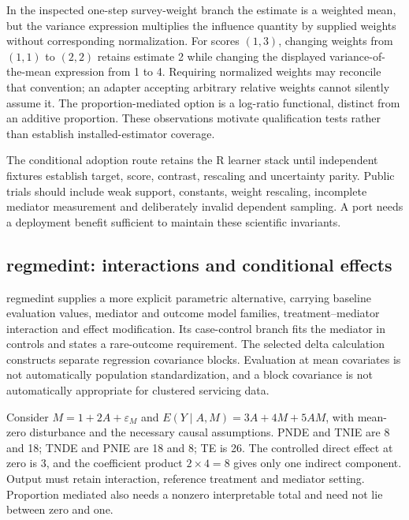 In the inspected one-step survey-weight branch the estimate is a weighted
mean, but the variance expression multiplies the influence quantity by supplied
weights without corresponding normalization. For scores $(1,3)$, changing
weights from $(1,1)$ to $(2,2)$ retains estimate 2 while changing the displayed
variance-of-the-mean expression from 1 to 4. Requiring normalized weights may
reconcile that convention; an adapter accepting arbitrary relative weights
cannot silently assume it. The proportion-mediated option is a log-ratio
functional, distinct from an additive proportion. These observations motivate
qualification tests rather than establish installed-estimator coverage.
\citep{exec25_rmed_medoutcon,exec25_rmed_choice}

The conditional adoption route retains the R learner stack until independent
fixtures establish target, score, contrast, rescaling and uncertainty parity.
Public trials should include weak support, constants, weight rescaling,
incomplete mediator measurement and deliberately invalid dependent sampling.
A port needs a deployment benefit sufficient to maintain these scientific
invariants. \citep{exec25_rmed_choice}

\subsection{regmedint: interactions and conditional effects}

regmedint supplies a more explicit parametric alternative, carrying baseline
evaluation values, mediator and outcome model families, treatment--mediator
interaction and effect modification. Its case-control branch fits the mediator
in controls and states a rare-outcome requirement. The selected delta
calculation constructs separate regression covariance blocks. Evaluation at
mean covariates is not automatically population standardization, and a block
covariance is not automatically appropriate for clustered servicing data.
\citep{exec25_rmed_regmedint}

Consider $M=1+2A+\varepsilon_M$ and
$E(Y\mid A,M)=3A+4M+5AM$, with mean-zero disturbance and the necessary causal
assumptions. PNDE and TNIE are 8 and 18; TNDE and PNIE are 18 and 8; TE is
26. The controlled direct effect at zero is 3, and the coefficient product
$2\times4=8$ gives only one indirect component. Output must retain interaction,
reference treatment and mediator setting. Proportion mediated also needs a
nonzero interpretable total and need not lie between zero and one.
\citep{exec25_rmed_regmedint,exec25_rmed_choice}

